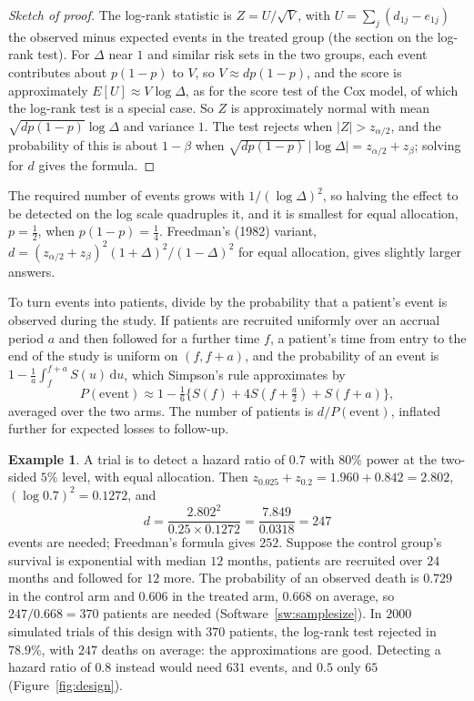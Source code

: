 \documentclass[11pt,a4paper]{article}
\numberwithin{equation}{section}
\theoremstyle{definition}
\newtheorem{exa}[thm]{Example}
\begin{document}
\begin{proof}[Sketch of proof]
The log-rank statistic is $Z = U/\sqrt V$, with $U = \sum_j(d_{1j} - e_{1j})$ the observed minus expected events in the treated group (the section on the log-rank test). For $\Delta$ near $1$ and similar risk sets in the two groups, each event contributes about $p(1 - p)$ to $V$, so $V \approx dp(1 - p)$, and the score is approximately $E[U] \approx V\log\Delta$, as for the score
test of the Cox model, of which the log-rank test is a special case. So $Z$ is approximately normal with mean $\sqrt{dp(1 - p)}\log\Delta$ and variance $1$. The test rejects when $|Z| > z_{\alpha/2}$, and the probability of this is about $1 - \beta$ when $\sqrt{dp(1 - p)}\,|\log\Delta| = z_{\alpha/2} + z_\beta$; solving for $d$ gives the formula.
\end{proof}

The required number of events grows with $1/(\log\Delta)^2$, so halving the effect to be detected on the log scale quadruples it, and it is smallest for equal allocation, $p = \frac12$, when $p(1 - p) = \frac14$. Freedman's (1982) variant, $d = (z_{\alpha/2} + z_\beta)^2(1 + \Delta)^2/(1 - \Delta)^2$ for equal allocation, gives slightly larger answers.

To turn events into patients, divide by the probability that a patient's event is observed during the study. If patients are recruited uniformly over an accrual period $a$ and then followed for a further time $f$, a patient's time from entry to the end of the study is uniform on $(f, f + a)$, and the probability of an event is $1 - \frac1a\int_f^{f+a}S(u)\,\mathrm du$, which Simpson's rule approximates by
\[
P(\text{event}) \approx 1 - \tfrac16\big\{S(f) + 4S(f + \tfrac a2) + S(f + a)\big\} ,
\]
averaged over the two arms. The number of patients is $d/P(\text{event})$, inflated further for expected losses to follow-up.

\begin{exa}
\label{ex:samplesize}
A trial is to detect a hazard ratio of $0.7$ with $80\%$ power at the two-sided $5\%$ level, with equal allocation. Then $z_{0.025} + z_{0.2} = 1.960 + 0.842 = 2.802$, $(\log 0.7)^2 = 0.1272$, and
\[
d = \frac{2.802^2}{0.25 \times 0.1272} = \frac{7.849}{0.0318} = 247
\]
events are needed; Freedman's formula gives $252$. Suppose the control group's survival is exponential with median $12$ months, patients are recruited over $24$ months and followed for $12$ more. The probability of an observed death is $0.729$ in the control arm and $0.606$ in the treated arm, $0.668$ on average, so $247/0.668 = 370$ patients are needed (Software~\ref{sw:samplesize}). In $2000$ simulated
trials of this design with $370$ patients, the log-rank test rejected in $78.9\%$, with $247$ deaths on average: the approximations are good. Detecting a hazard ratio of $0.8$ instead would need $631$ events, and $0.5$ only $65$ (Figure~\ref{fig:design}).
\end{exa}
\end{document}
